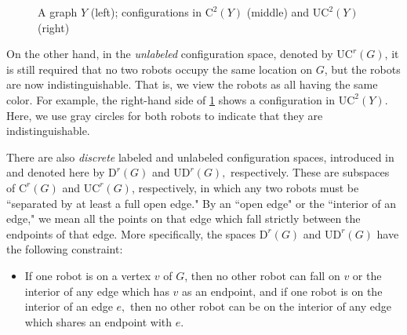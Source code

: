 \documentclass{amsart}
\newcommand{\C}{\mathrm{C}}
\newcommand{\UC}{\mathrm{UC}}
\newcommand{\D}{\mathrm{D}}
\newcommand{\UD}{\mathrm{UD}}
\newcommand{\vertex}[3][1]{
\node [circle,  fill, inner sep = 0pt,outer sep = 0pt, minimum size=#1mm] (#3) at #2 {};
}
\newcommand{\fg}[1]{
    \pgfdeclarelayer{foreground}
    \pgfsetlayers{main,foreground}
    \begin{pgfonlayer}{foreground}
    #1
    \end{pgfonlayer}
    }
\newcommand{\Ygraph}{
    \fg{\vertex{(0,0)}{B}
    \vertex{(0,-1)}{A}
    \vertex{(-.707,.707)}{C}
    \vertex{(.707,.707)}{D}
    \draw (A) -- (B) -- (C) -- (B) -- (D);
    }
}
\newcommand{\RedRobot}[2]{
\node [rectangle, cbred, fill, inner sep = 0pt,outer sep = 1pt, minimum size=2.3mm] (#2) at #1 {};
}
\newcommand{\GreenRobot}[2]{
\node [diamond, cbgreen, fill, inner sep = 0pt,outer sep = 1pt,minimum size=3mm] (#2) at #1 {};
}
\newcommand{\GrayRobot}[2]{
\node [circle, Gray, fill, inner sep = 0pt,outer sep = 1pt, minimum size=2.5mm] (#2) at #1 {};
}
\theoremstyle{definition}
\theoremstyle{remark}
\begin{document}
\begin{figure}[h!]
    \centering
    \hspace{1cm}
    \hspace{1cm}
    \caption{A graph $Y$ (left); configurations in $\C^2(Y)$ (middle) and $\UC^2(Y)$ (right)}
    \label{fig:NormalConfigSpaces}
\end{figure}

On the other hand, in the \textit{unlabeled} configuration space, denoted by $\UC^r(G)$, it is still required that no two robots occupy the same location on $G$, but the robots are now indistinguishable. That is, we view the robots as all having the same color. For example, the right-hand side of \cref{fig:NormalConfigSpaces} shows a configuration in $\UC^2(Y).$ Here, we use gray circles for both robots to indicate that they are indistinguishable.

There are also \textit{discrete} labeled and unlabeled configuration spaces, introduced in \cite{AbramsThesis} and denoted here by $\D^r(G)$ and $\UD^r(G),$ respectively. These are subspaces of $\C^r(G)$ and $\UC^r(G)$, respectively, in which any two robots must be ``separated by at least a full open edge."  By an ``open edge" or the ``interior of an edge," we mean all the points on that edge which fall strictly between the endpoints of that edge. More specifically, the spaces $\D^r(G)$ and $\UD^r(G)$ have the following constraint:

\begin{itemize}
    \item[($\ast$)] If one robot is on a vertex $v$ of $G$, then no other robot can fall on $v$ or the interior of any edge which has $v$ as an endpoint, and if one robot is on the interior of an edge $e,$ then no other robot can be on the interior of any edge which shares an endpoint with $e.$
\end{itemize} 
\end{document}
